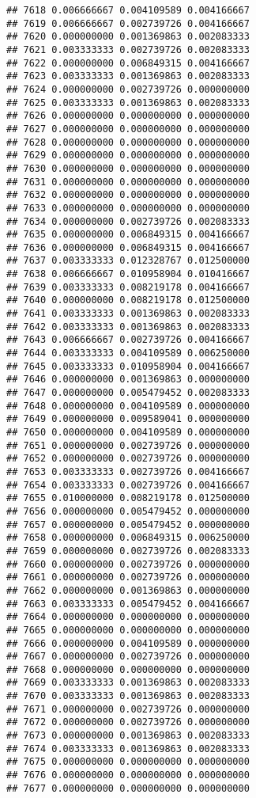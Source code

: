 \documentclass[
]{article}
\begin{document}
\begin{verbatim}
## 7618 0.006666667 0.004109589 0.004166667
## 7619 0.006666667 0.002739726 0.004166667
## 7620 0.000000000 0.001369863 0.002083333
## 7621 0.003333333 0.002739726 0.002083333
## 7622 0.000000000 0.006849315 0.004166667
## 7623 0.003333333 0.001369863 0.002083333
## 7624 0.000000000 0.002739726 0.000000000
## 7625 0.003333333 0.001369863 0.002083333
## 7626 0.000000000 0.000000000 0.000000000
## 7627 0.000000000 0.000000000 0.000000000
## 7628 0.000000000 0.000000000 0.000000000
## 7629 0.000000000 0.000000000 0.000000000
## 7630 0.000000000 0.000000000 0.000000000
## 7631 0.000000000 0.000000000 0.000000000
## 7632 0.000000000 0.000000000 0.000000000
## 7633 0.000000000 0.000000000 0.000000000
## 7634 0.000000000 0.002739726 0.002083333
## 7635 0.000000000 0.006849315 0.004166667
## 7636 0.000000000 0.006849315 0.004166667
## 7637 0.003333333 0.012328767 0.012500000
## 7638 0.006666667 0.010958904 0.010416667
## 7639 0.003333333 0.008219178 0.004166667
## 7640 0.000000000 0.008219178 0.012500000
## 7641 0.003333333 0.001369863 0.002083333
## 7642 0.003333333 0.001369863 0.002083333
## 7643 0.006666667 0.002739726 0.004166667
## 7644 0.003333333 0.004109589 0.006250000
## 7645 0.003333333 0.010958904 0.004166667
## 7646 0.000000000 0.001369863 0.000000000
## 7647 0.000000000 0.005479452 0.002083333
## 7648 0.000000000 0.004109589 0.000000000
## 7649 0.000000000 0.009589041 0.000000000
## 7650 0.000000000 0.004109589 0.000000000
## 7651 0.000000000 0.002739726 0.000000000
## 7652 0.000000000 0.002739726 0.000000000
## 7653 0.003333333 0.002739726 0.004166667
## 7654 0.003333333 0.002739726 0.004166667
## 7655 0.010000000 0.008219178 0.012500000
## 7656 0.000000000 0.005479452 0.000000000
## 7657 0.000000000 0.005479452 0.000000000
## 7658 0.000000000 0.006849315 0.006250000
## 7659 0.000000000 0.002739726 0.002083333
## 7660 0.000000000 0.002739726 0.000000000
## 7661 0.000000000 0.002739726 0.000000000
## 7662 0.000000000 0.001369863 0.000000000
## 7663 0.003333333 0.005479452 0.004166667
## 7664 0.000000000 0.000000000 0.000000000
## 7665 0.000000000 0.000000000 0.000000000
## 7666 0.000000000 0.004109589 0.000000000
## 7667 0.000000000 0.002739726 0.000000000
## 7668 0.000000000 0.000000000 0.000000000
## 7669 0.003333333 0.001369863 0.002083333
## 7670 0.003333333 0.001369863 0.002083333
## 7671 0.000000000 0.002739726 0.000000000
## 7672 0.000000000 0.002739726 0.000000000
## 7673 0.000000000 0.001369863 0.002083333
## 7674 0.003333333 0.001369863 0.002083333
## 7675 0.000000000 0.000000000 0.000000000
## 7676 0.000000000 0.000000000 0.000000000
## 7677 0.000000000 0.000000000 0.000000000

\end{verbatim}
\end{document}
